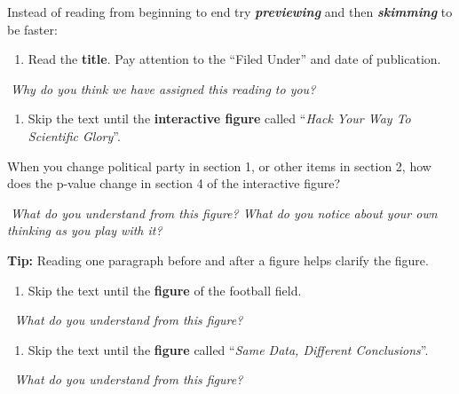 \documentclass[
  openany]{book}
\providecommand{\tightlist}{%
  \setlength{\itemsep}{0pt}\setlength{\parskip}{0pt}}
\begin{document}
Instead of reading from beginning to end try \textbf{\emph{previewing}} and then \textbf{\emph{skimming}} to be faster:

\begin{enumerate}
\def\labelenumi{\arabic{enumi}.}
\tightlist
\item
  Read the \textbf{title}. Pay attention to the ``Filed Under'' and date of publication.
\end{enumerate}

🤔\emph{Why do you think we have assigned this reading to you?}

\begin{enumerate}
\def\labelenumi{\arabic{enumi}.}
\setcounter{enumi}{1}
\tightlist
\item
  Skip the text until the \textbf{interactive figure} called ``\emph{Hack Your Way To Scientific Glory}''.
\end{enumerate}

When you change political party in section 1, or other items in section 2, how does the p-value change in section 4 of the interactive figure?

🤔\emph{What do you understand from this figure? What do you notice about your own thinking as you play with it?}

\textbf{Tip:} Reading one paragraph before and after a figure helps clarify the figure.

\begin{enumerate}
\def\labelenumi{\arabic{enumi}.}
\setcounter{enumi}{2}
\tightlist
\item
  Skip the text until the \textbf{figure} of the football field.
\end{enumerate}

🤔 \emph{What do you understand from this figure?}

\begin{enumerate}
\def\labelenumi{\arabic{enumi}.}
\setcounter{enumi}{3}
\tightlist
\item
  Skip the text until the \textbf{figure} called ``\emph{Same Data, Different Conclusions}''.
\end{enumerate}

🤔 \emph{What do you understand from this figure?}
\end{document}
